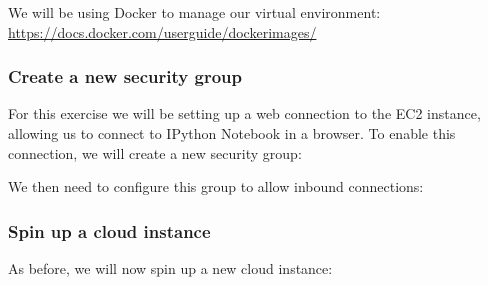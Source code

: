 We will be using Docker to manage our virtual environment:
\url{https://docs.docker.com/userguide/dockerimages/}

\subsubsection{Create a new security
group}\label{create-a-new-security-group}

For this exercise we will be setting up a web connection to the EC2
instance, allowing us to connect to IPython Notebook in a browser. To
enable this connection, we will create a new security group:

\begin{Shaded}
\begin{Highlighting}[]
\NormalTok{$ }  \NormalTok{\textbackslash{}}
     
\end{Highlighting}
\end{Shaded}

We then need to configure this group to allow inbound connections:

\begin{Shaded}
\begin{Highlighting}[]
\NormalTok{$ } 
    \NormalTok{\textbackslash{}}
   
   \NormalTok{22 \textbackslash{}}
   
 
    \NormalTok{\textbackslash{}}
   
   \NormalTok{8888 \textbackslash{}}
   
\end{Highlighting}
\end{Shaded}

\subsubsection{Spin up a cloud instance}\label{spin-up-a-cloud-instance}

As before, we will now spin up a new cloud instance:

